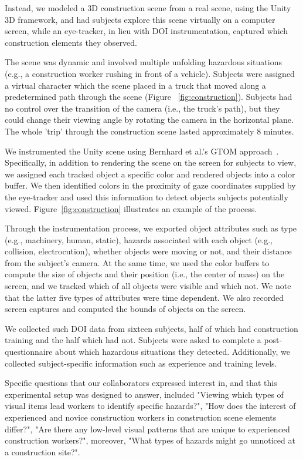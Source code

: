Instead, we modeled a 3D construction scene from a real scene, using the Unity 3D framework, and had subjects explore this scene virtually on a computer screen, while an eye-tracker, in lieu with DOI instrumentation, captured which construction elements they observed. 

The scene was dynamic and involved multiple unfolding hazardous situations (e.g., a construction worker rushing in front of a vehicle). Subjects were assigned a virtual character which the scene placed in a truck that moved along a predetermined path through the scene (Figure ~\ref{fig:construction}). Subjects had no control over the transition of the camera (i.e., the truck's path), but they could change their viewing angle by rotating the camera in the horizontal plane. The whole 'trip' through the construction scene lasted approximately $8$ minutes. 

We instrumented the Unity scene using Bernhard et al.'s GTOM approach~\cite{Bern14}. Specifically, in addition to rendering the scene on the screen for subjects to view, we assigned each tracked object a specific color and rendered objects into a color buffer. We then identified colors in the proximity of gaze coordinates supplied by the eye-tracker and used this information to detect objects subjects potentially viewed. Figure~\ref{fig:construction} illustrates an example of the process.

Through the instrumentation process, we exported object attributes such as type (e.g., machinery, human, static), hazards associated with each object (e.g., collision, electrocution), whether objects were moving or not,  and their distance from the subject's camera. At the same time, we used the color buffers to compute the size of objects and their position (i.e., the center of mass) on the screen, and we tracked which of all objects were visible and which not. We note that the latter five types of attributes were time dependent. We also recorded screen captures and computed the bounds of objects on the screen. 

We collected such DOI data from sixteen subjects, half of which had construction training and the half which had not. Subjects were asked to complete a post-questionnaire about which hazardous situations they detected. Additionally, we collected subject-specific information such as experience and training levels. 

Specific questions that our collaborators expressed interest in, and that this experimental setup was designed to answer, included "Viewing which types of visual items lead workers to identify specific hazards?", "How does the interest of experienced and novice construction workers in construction scene elements differ?", "Are there any low-level visual patterns that are unique to experienced construction workers?", moreover, "What types of hazards might go unnoticed at a construction site?".

